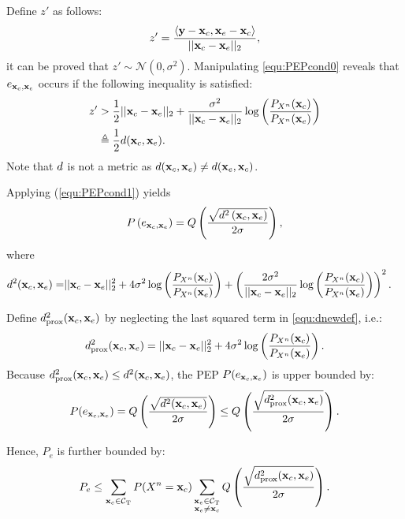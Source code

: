 \documentclass [PhD] {uclathes}
\begin{document}
Define $z'$ as follows:
\begin{align}
    \label{equ:yprimedef}
    z' = \frac{\langle \mathbf{y}-\mathbf{x}_{c}, \mathbf{x}_{e} - \mathbf{x}_{c} \rangle}{||\mathbf{x}_{c} - \mathbf{x}_{e} ||_2},
\end{align}
it can be proved that $z'\sim\mathcal{N}(0,\sigma^2)$. Manipulating \eqref{equ:PEPcond0} reveals that $e_{\mathbf{x}_c,\mathbf{x}_e}$ occurs if the following inequality is satisfied: 
\begin{align}
    \label{equ:PEPcond1}
    z' &> \frac{1}{2}||\mathbf{x}_{c} - \mathbf{x}_{e} ||_2 + \frac{\sigma^2}{||\mathbf{x}_{c} - \mathbf{x}_{e} ||_2}\log\left(\frac{P_{X^n}(\mathbf{x}_{c})}{P_{X^n}(\mathbf{x}_{e})}\right) \\ &\triangleq  \frac{1}{2}d(\mathbf{x}_{c}, \mathbf{x}_{e}).
\end{align}
Note that $d$ is not a metric as $d(\mathbf{x}_{c},\mathbf{x}_{e})\neq d(\mathbf{x}_{e},\mathbf{x}_{c})$.

Applying (\ref{equ:PEPcond1}) yields
\begin{equation}
    \label{equ:PEPcond2}
    P\left(e_{\mathbf{x}_c,\mathbf{x}_e}\right) = Q\left(\frac{\sqrt{d^2\left(\mathbf{x}_{c}, \mathbf{x}_{e}\right)}}{2\sigma}\right),
\end{equation}
where
\begin{align}
    \label{equ:dnewdef}
    d^2(\mathbf{x}_{c}, \mathbf{x}_{e}) = & ||\mathbf{x}_{c} - \mathbf{x}_{e} ||_2^2   + 4\sigma^2 \log\left(\frac{P_{X^n}(\mathbf{x}_{c})}{P_{X^n}(\mathbf{x}_{e})}\right) + \left(\frac{2\sigma^2}{||\mathbf{x}_{c} - \mathbf{x}_{e} ||_2}\log\left(\frac{P_{X^n}(\mathbf{x}_{c})}{P_{X^n}(\mathbf{x}_{e})}\right)\right)^2.
\end{align}

Define $d_{\mathrm{prox}}^2(\mathbf{x}_{c}, \mathbf{x}_{e})$ by neglecting the last squared term in \eqref{equ:dnewdef}, i.e.:
\begin{equation}
    \label{equ:dadef}
    d_{\mathrm{prox}}^2(\mathbf{x}_{c}, \mathbf{x}_{e}) = ||\mathbf{x}_{c} - \mathbf{x}_{e} ||_2^2 + 4\sigma^2 \log\left(\frac{P_{X^n}(\mathbf{x}_{c})}{P_{X^n}(\mathbf{x}_{e})}\right).
\end{equation}
 Because $d_{\mathrm{prox}}^2(\mathbf{x}_{c}, \mathbf{x}_{e}) \leq d^2(\mathbf{x}_{c}, \mathbf{x}_{e})$, the PEP $P(e_{\mathbf{x}_c,\mathbf{x}_e})$ is upper bounded by:
\begin{align}
    P(e_{\mathbf{x}_c,\mathbf{x}_e}) = Q\left(\frac{\sqrt{d^2{(\mathbf{x}_{c},\mathbf{x}_{e})}}}{2\sigma}\right) \leq Q\left(\frac{\sqrt{d_{\mathrm{prox}}^2{(\mathbf{x}_{c},\mathbf{x}_{e})}}}{2\sigma}\right).
\end{align}

Hence, $P_e$ is further bounded by:
\begin{align}\label{equ: PEPbound2}
P_e\leq\sum_{\mathbf{x}_c\in\mathcal{C}_{\mathrm{T}}}P(X^n=\mathbf{x}_c)\sum_{\substack{\mathbf{x}_e\in\mathcal{C}_{\mathrm{T}}\\\mathbf{x}_e\neq\mathbf{x}_c}} Q\left(\frac{\sqrt{d_{\mathrm{prox}}^2{(\mathbf{x}_{c},\mathbf{x}_{e})}}}{2\sigma}\right).
\end{align}
\end{document}
